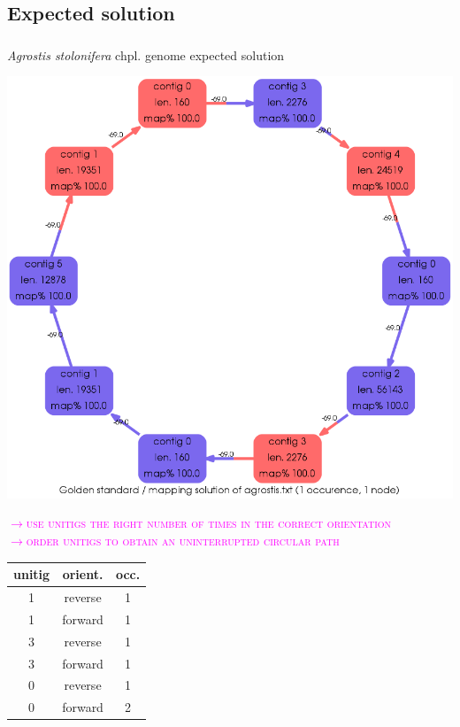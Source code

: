 \documentclass{beamer}
\begin{document}
\subsection{Expected solution}\label{exp}
\begin{frame}
\frametitle{\textsc{}}
{\textit{Agrostis stolonifera} chpl. genome expected solution} \\
\begin{minipage}{0.65\textwidth}
\includegraphics[scale=0.2]{agrostis_GOLD.png}
\end{minipage}
%
\begin{minipage}{0.3\textwidth}
\tiny
\textsc{\textcolor{magenta}{$\to$use unitigs the right number of times in the correct orientation \\ $\to $order unitigs to obtain an uninterrupted circular path}} \\
\vspace*{0.7cm}

\begin{tabular}{ | c | c | c |}
  \hline  
unitig & orient. & occ. \\\hline         
1 & reverse & 1\\
1 & forward & 1\\
3 & reverse & 1\\
3 & forward & 1\\
0 & reverse & 1\\
0 & forward & 2\\
  \hline  
\end{tabular}
\end{minipage}

\end{frame}
\end{document}
